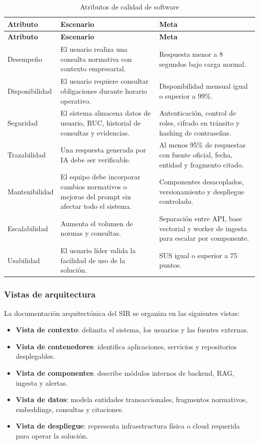 \documentclass[12pt,a4paper,oneside]{report}
\begin{document}
\begin{longtable}{p{}p{}p{}}
\caption{Atributos de calidad de software}\label{tab:cap3-atributos-calidad}\\
\toprule
\textbf{Atributo} & \textbf{Escenario} & \textbf{Meta} \\
\midrule
\endfirsthead
\toprule
\textbf{Atributo} & \textbf{Escenario} & \textbf{Meta} \\
\midrule
\endhead
Desempeño & El usuario realiza una consulta normativa con contexto empresarial. & Respuesta menor a 8 segundos bajo carga normal. \\
Disponibilidad & El usuario requiere consultar obligaciones durante horario operativo. & Disponibilidad mensual igual o superior a 99\%. \\
Seguridad & El sistema almacena datos de usuario, RUC, historial de consultas y evidencias. & Autenticación, control de roles, cifrado en tránsito y hashing de contraseñas. \\
Trazabilidad & Una respuesta generada por IA debe ser verificable. & Al menos 95\% de respuestas con fuente oficial, fecha, entidad y fragmento citado. \\
Mantenibilidad & El equipo debe incorporar cambios normativos o mejoras del prompt sin afectar todo el sistema. & Componentes desacoplados, versionamiento y despliegue controlado. \\
Escalabilidad & Aumenta el volumen de normas y consultas. & Separación entre API, base vectorial y worker de ingesta para escalar por componente. \\
Usabilidad & El usuario líder valida la facilidad de uso de la solución. & SUS igual o superior a 75 puntos. \\
\bottomrule
\end{longtable}

\subsubsection{Vistas de arquitectura}\label{subsubsec:vistas-arquitectura}

La documentación arquitectónica del SIR se organiza en las siguientes vistas:

\begin{itemize}
    \item \textbf{Vista de contexto}: delimita el sistema, los usuarios y las fuentes externas.
    \item \textbf{Vista de contenedores}: identifica aplicaciones, servicios y repositorios desplegables.
    \item \textbf{Vista de componentes}: describe módulos internos de backend, RAG, ingesta y alertas.
    \item \textbf{Vista de datos}: modela entidades transaccionales, fragmentos normativos, embeddings, consultas y citaciones.
    \item \textbf{Vista de despliegue}: representa infraestructura física o cloud requerida para operar la solución.
\end{itemize}
\end{document}
